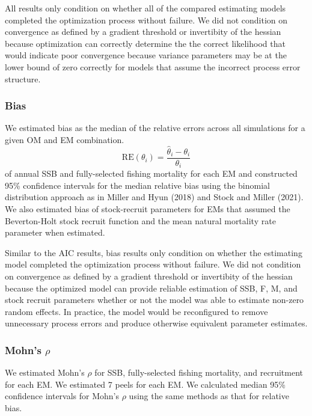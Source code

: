 \documentclass[
  12pt,
]{article}
\begin{document}
All results only condition on whether all of the compared estimating
models completed the optimization process without failure. We did not
condition on convergence as defined by a gradient threshold or
invertibity of the hessian because optimization can correctly determine
the the correct likelihood that would indicate poor convergence because
variance parameters may be at the lower bound of zero correctly for
models that assume the incorrect process error structure.

\hypertarget{bias}{%
\subsubsection*{Bias}\label{bias}}

We estimated bias as the median of the relative errors across all
simulations for a given OM and EM combination. \[
\text{RE}\left(\theta_i\right) = \frac{\widehat \theta_i - \theta_i}{\theta_i}
\] of annual SSB and fully-selected fishing mortality for each EM and
constructed 95\% confidence intervals for the median relative bias using
the binomial distribution approach as in Miller and Hyun (2018) and
Stock and Miller (2021). We also estimated bias of stock-recruit
parameters for EMs that assumed the Beverton-Holt stock recruit function
and the mean natural mortality rate parameter when estimated.

Similar to the AIC results, bias results only condition on whether the
estimating model completed the optimization process without failure. We
did not condition on convergence as defined by a gradient threshold or
invertibity of the hessian because the optimized model can provide
reliable estimation of SSB, F, M, and stock recruit parameters whether
or not the model was able to estimate non-zero random effects. In
practice, the model would be reconfigured to remove unnecessary process
errors and produce otherwise equivalent parameter estimates.

\hypertarget{mohns-rho}{%
\subsubsection*{\texorpdfstring{Mohn's
\(\rho\)}{Mohn's \textbackslash rho}}\label{mohns-rho}}

We estimated Mohn's \(\rho\) for SSB, fully-selected fishing mortality,
and recruitment for each EM. We estimated 7 peels for each EM. We
calculated median 95\% confidence intervals for Mohn's \(\rho\) using
the same methods as that for relative bias.
\end{document}
